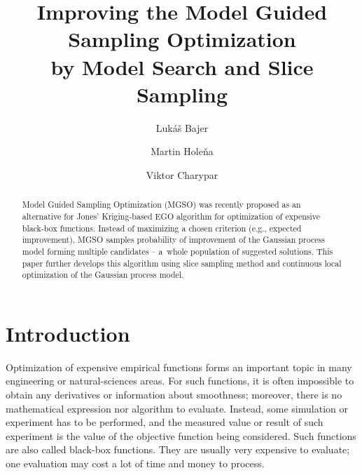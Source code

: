 \documentclass{itatnew}
\begin{document}
\title{Improving the Model Guided Sampling Optimization \\
  by Model Search and Slice Sampling}

\author{Lukáš Bajer \and Martin Holeňa \and Viktor Charypar }


\maketitle              %

\begin{abstract}
Model Guided Sampling Optimization (MGSO) was recently proposed as an alternative for Jones' Kriging-based EGO algorithm for optimization of expensive black-box functions. Instead of maximizing a chosen criterion (e.g., expected improvement), MGSO samples probability of improvement of the Gaussian process model forming multiple candidates -- a~whole population of suggested solutions. This paper further develops this algorithm using slice sampling method and continuous local optimization of the Gaussian process model.
\end{abstract}

\section{Introduction}
%
Optimization of expensive empirical functions forms an important topic in many engineering or natural-sciences areas. For such functions, it is often impossible to obtain any derivatives or information about smoothness; moreover, there is no mathematical expression nor algorithm to evaluate. Instead, some simulation or experiment has to be performed, and the measured value or result of such experiment is the value of the objective function being considered. Such functions are also called black-box functions. 
They are usually very expensive to evaluate; one evaluation may cost a lot of time and money to process.
\end{document}
